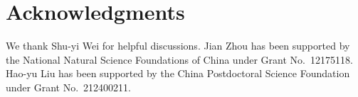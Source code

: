 \documentclass[prd,aps,preprint,tightenlines,nofootinbib,superscriptaddress]{revtex4}
\begin{document}
\section*{Acknowledgments}
We thank Shu-yi Wei for helpful discussions. 
Jian Zhou has been supported by the National Natural Science Foundations of China under Grant No.\ 12175118. Hao-yu Liu has been supported by the China Postdoctoral Science Foundation under Grant No.~212400211. 

 



\end{document}
